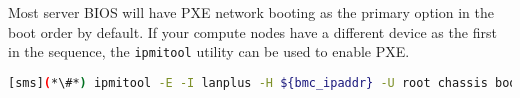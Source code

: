 \begin{center}
\begin{tcolorbox}[]
\small
Most server BIOS will have PXE network booting as the primary option in the boot
order by default. If your compute nodes have a different device as the first in the
sequence, the \texttt{ipmitool} utility can be used to enable PXE.
\begin{lstlisting}[language=bash]
[sms](*\#*) ipmitool -E -I lanplus -H ${bmc_ipaddr} -U root chassis bootdev pxe options=persistent
\end{lstlisting}
\end{tcolorbox}
\end{center}
